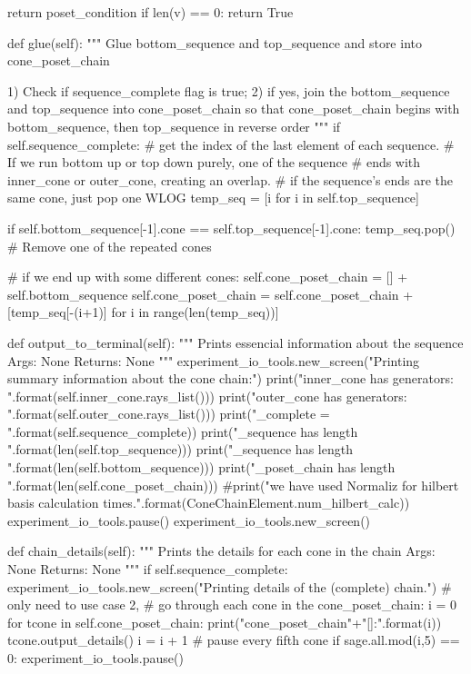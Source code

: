 \documentclass{TC}
\begin{document}
\begin{SAGE}
			return poset_condition
		if len(v) == 0:
			return True

	def glue(self):
		""" Glue bottom_sequence and top_sequence and store into 
		cone_poset_chain

		1) Check if sequence_complete flag is true; 
		2) if yes, join the bottom_sequence and top_sequence into cone_poset_chain
		so that cone_poset_chain begins with bottom_sequence, then top_sequence in reverse order
		"""
		if self.sequence_complete:
			# get the index of the last element of each sequence.
			# If we run bottom up or top down purely, one of the sequence
			# ends with inner_cone or outer_cone, creating an overlap.
			# if the sequence's ends are the same cone, just pop one WLOG
			temp_seq = [i for i in self.top_sequence]
				
			if self.bottom_sequence[-1].cone == self.top_sequence[-1].cone:
				temp_seq.pop() # Remove one of the repeated cones
 
			# if we end up with some different cones:
			self.cone_poset_chain = [] + self.bottom_sequence
			self.cone_poset_chain = self.cone_poset_chain + [temp_seq[-(i+1)] for i in range(len(temp_seq))]
			
	def output_to_terminal(self):
		""" Prints essencial information about the sequence
			Args: None
			Returns: None 
		"""
		experiment_io_tools.new_screen("Printing summary information about the cone chain:")
		print("inner_cone has generators: \n{}\n".format(self.inner_cone.rays_list()))
		print("outer_cone has generators: \n{}\n".format(self.outer_cone.rays_list()))
		print("\tsequence_complete = {}\n".format(self.sequence_complete))
		print("\ttop_sequence has length {}\n".format(len(self.top_sequence)))
		print("\tbottom_sequence has length {}\n".format(len(self.bottom_sequence)))
		print("\tcone_poset_chain has length {}\n".format(len(self.cone_poset_chain)))
		#print("we have used Normaliz for hilbert basis calculation {} times.".format(ConeChainElement.num_hilbert_calc))
		experiment_io_tools.pause()
		experiment_io_tools.new_screen()

	
		

	def chain_details(self):
		""" Prints the details for each cone in the chain 
			Args: None
			Returns: None
		"""
		if self.sequence_complete:
			experiment_io_tools.new_screen("Printing details of the (complete) chain.")
			# only need to use case 2,
			# go through each cone in the cone_poset_chain:
			i = 0
			for tcone in self.cone_poset_chain:
				print("cone_poset_chain"+"[{}]:".format(i))
				tcone.output_details()
				i = i + 1 
				# pause every fifth cone
				if sage.all.mod(i,5) == 0:
					experiment_io_tools.pause()


\end{SAGE}
\end{document}
